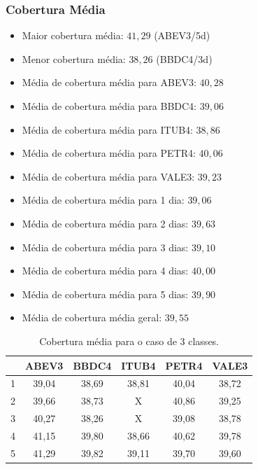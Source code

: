 \documentclass[grad,numbers]{coppe}
\begin{document}
	 			\subsubsection{Cobertura Média}
					\begin{itemize}
		 				\item Maior cobertura média: $41,29$ (ABEV3/5d)
		 				\item Menor cobertura média: $38,26$ (BBDC4/3d)
		 				\item Média de cobertura média para ABEV3: $40,28$
		 				\item Média de cobertura média para BBDC4: $39,06$
		 				\item Média de cobertura média para ITUB4: $38,86$
		 				\item Média de cobertura média para PETR4: $40,06$
		 				\item Média de cobertura média para VALE3: $39,23$
		 				\item Média de cobertura média para 1 dia: $39,06$
		 				\item Média de cobertura média para 2 dias: $39,63$
		 				\item Média de cobertura média para 3 dias: $39,10$
		 				\item Média de cobertura média para 4 dias: $40,00$
		 				\item Média de cobertura média para 5 dias: $39,90$
		 				\item Média de cobertura média geral: $39,55$
		 			\end{itemize}
		 			\begin{table}[h]
		 				\caption{Cobertura média para o caso de 3 classes.}
		 				\label{tab:3c_co_analysis}
		 				\centering
		 				{\footnotesize
		 					\begin{tabular}{|c|c|c|c|c|c|}
		 						\hline
		 						\diagbox[linewidth=0.2pt, width=\dimexpr \textwidth/10+2\tabcolsep\relax, height=0.8cm]{Dias}{Ativo}
		 						& ABEV3 & BBDC4 & ITUB4 & PETR4 & VALE3\\
		 						\hline
		 						1 & 39,04 & 38,69 & 38,81 & 40,04 & 38,72 \\
		 						2 & 39,66 & 38,73 & X     & 40,86 & 39,25 \\
		 						3 & 40,27 & 38,26 & X     & 39,08 & 38,78 \\
		 						4 & 41,15 & 39,80 & 38,66 & 40,62 & 39,78 \\
		 						5 & 41,29 & 39,82 & 39,11 & 39,70 & 39,60 \\
		 						\hline
		 				\end{tabular}}
		 			\end{table}
	 			\newpage
\end{document}
